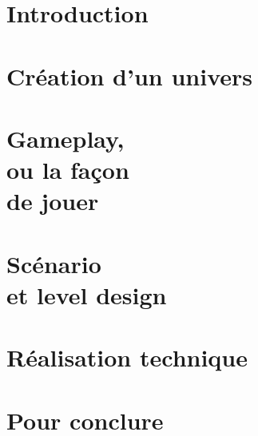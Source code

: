 \chapter{Introduction}



\chapter{Création d'un univers}



\chapter[Gameplay, ou la façon de jouer]{Gameplay,\\ou la façon\\de jouer}


\chapter[Scénario et level design]{Scénario\\et level design}


%



\chapter{Réalisation technique}



%


\chapter{Pour conclure}





\appendices
\renewcommand{\thecontentspage}{Annexe}





